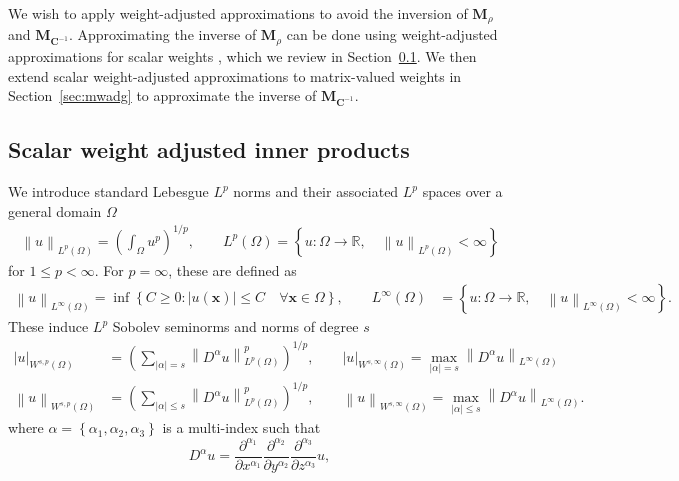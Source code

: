 \documentclass{siamart0216}
\newcommand{\pd}[2]{\frac{\partial#1}{\partial#2}}
\newcommand{\nor}[1]{\left\| #1 \right\|}
\newcommand{\LRp}[1]{\left( #1 \right)}
\newcommand{\LRb}[1]{\left| #1 \right|}
\newcommand{\LRc}[1]{\left\{ #1 \right\}}
\begin{document}
We wish to apply weight-adjusted approximations to avoid the inversion of $\bm{M}_\rho$ and $\bm{M}_{\bm{C}^{-1}}$.  Approximating the inverse of $\bm{M}_\rho$ can be done using weight-adjusted approximations for scalar weights \cite{chan2016weight1,chan2016weight2}, which we review in Section~\ref{sec:swadg}.  We then extend scalar weight-adjusted approximations to matrix-valued weights in Section~\ref{sec:mwadg} to approximate the inverse of $\bm{M}_{\bm{C}^{-1}}$.  

\subsection{Scalar weight adjusted inner products}
\label{sec:swadg}

We introduce standard Lebesgue $L^p$ norms and their associated $L^p$ spaces over a general domain $\Omega$
\begin{align*}
\nor{u}_{L^p\LRp{\Omega}} = \LRp{\int_{\Omega} u^p}^{1/p}, \qquad  
L^p\LRp{\Omega} = \LRc{u: \Omega\rightarrow \mathbb{R}, \quad \nor{u}_{L^p\LRp{\Omega}} < \infty} 
\end{align*}
for $1 \leq p < \infty$.  For $p = \infty$, these are defined as
\begin{align*}
\nor{u}_{L^{\infty}\LRp{\Omega}} = \inf\LRc{C \geq 0: \LRb{u\LRp{\bm{x}}} \leq C \quad \forall \bm{x}\in \Omega}, \qquad L^{\infty}\LRp{\Omega} &= \LRc{u: \Omega\rightarrow \mathbb{R}, \quad \nor{u}_{L^{\infty}\LRp{\Omega}} < \infty}.
\end{align*}
These induce $L^p$ Sobolev seminorms and norms of degree $s$ 
\begin{align*}
\LRb{u}_{W^{s,p}\LRp{\Omega}} &= \LRp{\sum_{\LRb{\alpha}= s} \nor{ D^{\alpha} u}_{L^p\LRp{\Omega}}^p}^{1/p}, \qquad \LRb{u}_{W^{s,\infty}\LRp{\Omega}} = \max_{\LRb{\alpha}= s} \nor{D^{\alpha}u}_{L^{\infty}\LRp{\Omega}}\\
\nor{u}_{W^{s,p}\LRp{\Omega}} &= \LRp{\sum_{\LRb{\alpha}\leq s} \nor{ D^{\alpha} u}_{L^p\LRp{\Omega}}^p}^{1/p}, \qquad \nor{u}_{W^{s,\infty}\LRp{\Omega}} = \max_{\LRb{\alpha}\leq s} \nor{D^{\alpha}u}_{L^{\infty}\LRp{\Omega}}.
\end{align*}
where $\alpha = \LRc{\alpha_1,\alpha_2,\alpha_3}$ is a multi-index such that
\[
D^{\alpha}u = \pd{^{\alpha_1}}{x^{\alpha_1}}\pd{^{\alpha_2}}{y^{\alpha_2}}\pd{^{\alpha_3}}{z^{\alpha_3}} u,
\]
\end{document}
